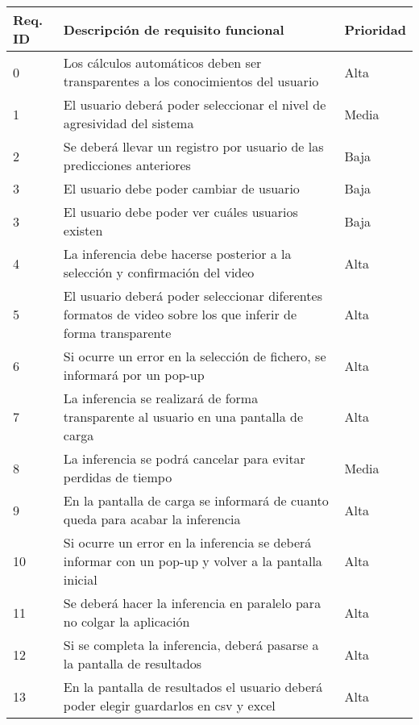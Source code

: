\begin{table}[H]
    \begin{center}
        \begin{tabular}{p{} | p{} p{}}
            Req. ID & Descripción de requisito funcional & Prioridad\\
            \hline
            0& Los cálculos automáticos deben ser transparentes a los conocimientos del usuario & Alta\\
            \hline
            1& El usuario deberá poder seleccionar el nivel de agresividad del sistema & Media\\
            \hline
            2& Se deberá llevar un registro por usuario de las predicciones anteriores & Baja\\
            \hline
            3& El usuario debe poder cambiar de usuario & Baja\\
            \hline
            3& El usuario debe poder ver cuáles usuarios existen & Baja\\
            \hline
            4& La inferencia debe hacerse posterior a la selección y confirmación del video & Alta\\
            \hline
            5& El usuario deberá poder seleccionar diferentes formatos de video sobre los que inferir de forma transparente & Alta\\
            \hline
            6& Si ocurre un error en la selección de fichero, se informará por un pop-up & Alta\\
            \hline
            7& La inferencia se realizará de forma transparente al usuario en una pantalla de carga & Alta\\
            \hline
            8& La inferencia se podrá cancelar para evitar perdidas de tiempo & Media\\
            \hline
            9& En la pantalla de carga se informará de cuanto queda para acabar la inferencia & Alta\\
            \hline
            10& Si ocurre un error en la inferencia se deberá informar con un pop-up y volver a la pantalla inicial & Alta\\
            \hline
            11& Se deberá hacer la inferencia en paralelo para no colgar la aplicación & Alta\\
            \hline
            12& Si se completa la inferencia, deberá pasarse a la pantalla de resultados & Alta\\
            \hline
            13& En la pantalla de resultados el usuario deberá poder elegir guardarlos en csv y excel & Alta\\

\end{tabular}
\end{center}
\end{table}
